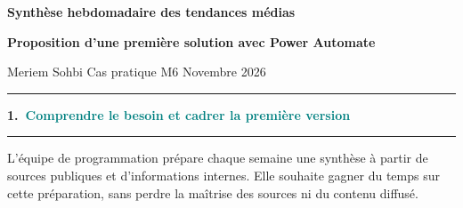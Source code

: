 \documentclass[10pt,a4paper]{article}
\newcommand{\partie}[2]{%
  {\Large\bfseries #1.\ \textcolor{teal}{#2}}\par\vspace{3pt}
  {\color{black!20}\rule{\linewidth}{0.4pt}}\par\vspace{4pt}}
\begin{document}
{\LARGE\bfseries Synthèse hebdomadaire des tendances médias\par}
\vspace{1pt}
{\bfseries Proposition d’une première solution avec Power Automate\par}
\vspace{1pt}
{\small\color{muted}Meriem Sohbi \textperiodcentered{} Cas pratique M6 \textperiodcentered{} Novembre 2026\par}
\vspace{3pt}
{\color{teal}\rule{\linewidth}{1.2pt}}\par\vspace{6pt}

\partie{1}{Comprendre le besoin et cadrer la première version}

L’équipe de programmation prépare chaque semaine une synthèse à partir de sources publiques et d’informations internes. Elle souhaite gagner du temps sur cette préparation, sans perdre la maîtrise des sources ni du contenu diffusé.
\end{document}
